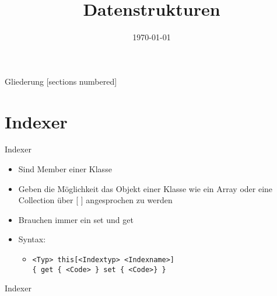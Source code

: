 



\title{Datenstrukturen}
\date{\today}




\maketitle

\begin{frame}{Gliederung}
	[sections numbered]
	\tableofcontents
\end{frame}

\section{Indexer}
\begin{frame}{Indexer}
	\begin{itemize}
		\item Sind Member einer Klasse
		\item Geben die Möglichkeit das Objekt einer Klasse wie ein Array oder eine Collection über \alert{[ ]} angesprochen zu werden
		\item Brauchen immer ein \alert{set} und \alert{get}
		\item Syntax:
		\begin{itemize}
			\item \texttt{\alert{<Typ>} this[\alert{<Indextyp> <Indexname>}]\\ \{ get \{ \alert{<Code>} \} set \{ \alert{<Code>}\} \}}
		\end{itemize}
	\end{itemize}
\end{frame}

\begin{frame}{Indexer}
	
\end{frame}

